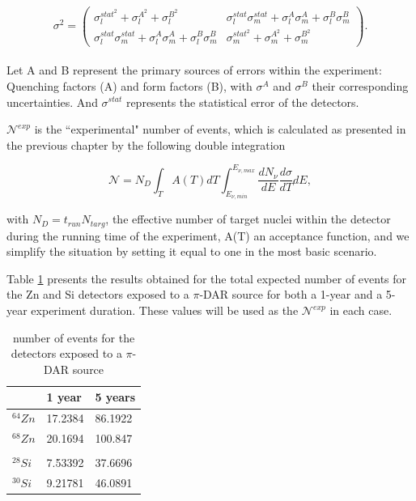 \begin{equation}
    \sigma^2=\begin{pmatrix}
              \sigma_l^{{stat}^2}+\sigma_l^{A^2}+\sigma_l^{B^2} & \sigma_l^{stat}\sigma_m^{stat}+\sigma_l^A\sigma_m^A+\sigma_l^B\sigma_m^B\\
              \sigma_l^{stat}\sigma_m^{stat}+\sigma_l^A\sigma_m^A+\sigma_l^B\sigma_m^B & \sigma_m^{{stat}^2}+\sigma_m^{A^2}+\sigma_m^{B^2}
              \end{pmatrix}.
\end{equation}
\\
Let A and B represent the primary sources of errors within the experiment: Quenching factors (A) and form factors (B), with $\sigma^A$ and $\sigma^B$ their corresponding uncertainties. And $\sigma^{stat}$  represents the statistical error of the detectors.

$\mathcal{N}^{exp}$  is the ``experimental" number of events, which is calculated as presented in the previous chapter by the following double integration

\begin{equation}
    \mathcal{N}=N_D\int_T A(T) dT \int_{E_{\nu,min}}^{E_{\nu,max}} \frac{dN_\nu}{dE} \frac{d\sigma}{dT} dE,
\label{N}
\end{equation}

with $N_D=t_{run}N_{targ}$, the effective number of target nuclei within the detector during the running time of the experiment,  A(T) an acceptance function, and we simplify the situation by setting it equal to one in the most basic scenario.

Table \ref{events} presents the results obtained for the total expected number of events for the Zn and Si detectors exposed to a $\pi$-DAR source for both a 1-year and a 5-year experiment duration. These values will be used as the $\mathcal{N}^{exp}$ in each case.
\\
\begin{table}[h]
\centering

 
\begin{tabular}{ p{3cm}p{3cm}p{3cm}  }
\toprule
    & 1 year & 5 years                               \\ \midrule
$^{64}Zn$ & 17.2384      & 86.1922                                              \\
$^{68}Zn$ & 20.1694      &  100.847   \\
           &              \\
$^{28}Si$ & 7.53392      &    37.6696                              \\
$^{30}Si$ & 9.21781     & 46.0891                                     \\ \bottomrule
\end{tabular}
 \caption{number of events for the detectors exposed to a $\pi$-DAR source}
\label{events}
\end{table}



